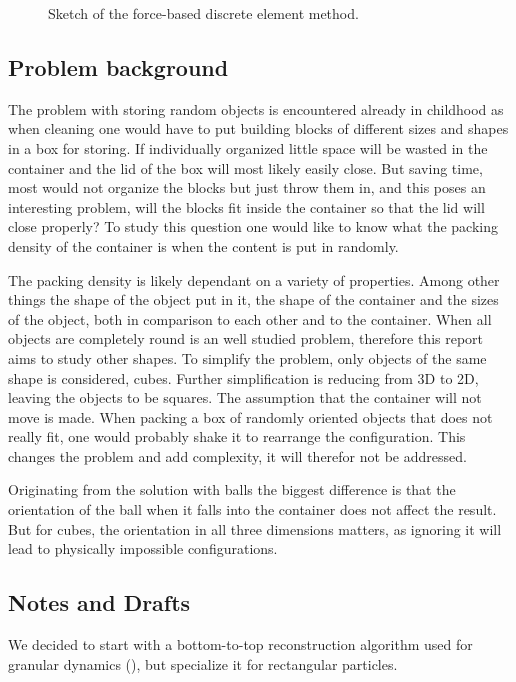 \documentclass[12pt, sumlimits, intlimits]{article}
\begin{document}
\begin{figure}
\caption{Sketch of the force-based discrete element method.}
\label{f/dem}
\end{figure}

\subsection{Problem background}
The problem with storing random objects is encountered already in childhood as when cleaning one would have to put building blocks of different sizes and shapes in a box for storing. If individually organized little space will be wasted in the container and the lid of the box will most likely easily close. But saving time, most would not organize the blocks but just throw them in, and this poses an interesting problem, will the blocks fit inside the container so that the lid will close properly?
To study this question one would like to know what the packing density of the container is when the content is put in randomly.

The packing density is likely dependant on a variety of properties. Among other things the shape of the object put in it, the shape of the container and the sizes of the object, both in comparison to each other and to the container. When all objects are completely round is an well studied problem, therefore this report aims to study other shapes.
To simplify the problem, only objects of the same shape is considered, cubes. Further simplification is reducing from 3D to 2D, leaving the objects to be squares.
The assumption that the container will not move is made. When packing a box of randomly oriented objects that does not really fit, one would probably shake it to rearrange the configuration. This changes the problem and add complexity, it will therefor not be addressed.

Originating from the solution with balls the biggest difference is that the orientation of the ball when it falls into the container does not affect the result. But for cubes, the orientation in all three dimensions matters, as ignoring it will lead to physically impossible configurations.

\subsection{Notes and Drafts}

We decided to start with a bottom-to-top reconstruction algorithm used
for granular dynamics (\cite{poschel-2005}),
but specialize it for rectangular particles.
\end{document}
